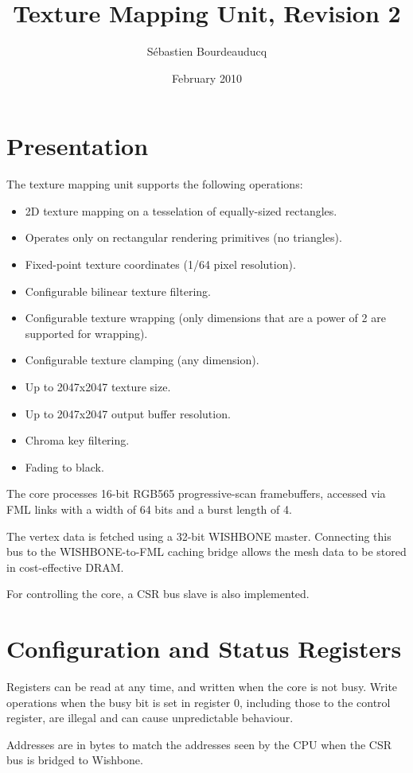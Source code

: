 \documentclass[a4paper,11pt]{article}
\title{Texture Mapping Unit, Revision 2}
\author{S\'ebastien Bourdeauducq}
\date{February 2010}
\begin{document}
\setlength{\parindent}{0pt}
\setlength{\parskip}{5pt}
\maketitle{}

\section{Presentation}
The texture mapping unit supports the following operations:
\begin{itemize}
\item 2D texture mapping on a tesselation of equally-sized rectangles.
\item Operates only on rectangular rendering primitives (no triangles).
\item Fixed-point texture coordinates (1/64 pixel resolution).
\item Configurable bilinear texture filtering.
\item Configurable texture wrapping (only dimensions that are a power of 2 are supported for wrapping).
\item Configurable texture clamping (any dimension).
\item Up to 2047x2047 texture size.
\item Up to 2047x2047 output buffer resolution.
\item Chroma key filtering.
\item Fading to black.
\end{itemize}

The core processes 16-bit RGB565 progressive-scan framebuffers, accessed via FML links with a width of 64 bits and a burst length of 4.

The vertex data is fetched using a 32-bit WISHBONE master. Connecting this bus to the WISHBONE-to-FML caching bridge allows the mesh data to be stored in cost-effective DRAM.

For controlling the core, a CSR bus slave is also implemented.

\section{Configuration and Status Registers}
Registers can be read at any time, and written when the core is not busy. Write operations when the busy bit is set in register 0, including those to the control register, are illegal and can cause unpredictable behaviour.

Addresses are in bytes to match the addresses seen by the CPU when the CSR bus is bridged to Wishbone.
\end{document}
